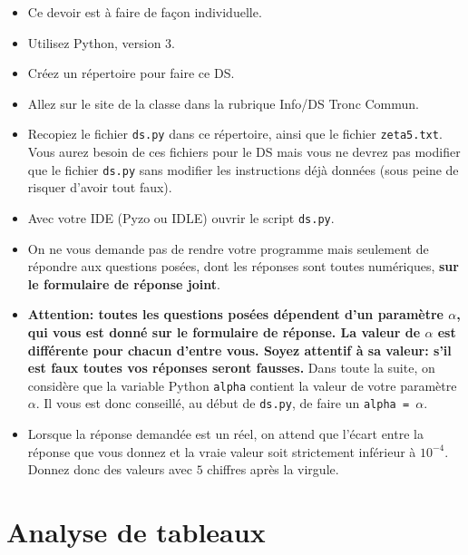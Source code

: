 \exer{}
\setcounter{numques}{0}

\begin{itemize}
\item Ce devoir est à faire de façon individuelle.
\item Utilisez Python, version 3.
\item Créez un répertoire pour faire ce DS.
\item Allez sur le site de la classe dans la rubrique Info/DS Tronc Commun.
\item Recopiez le fichier
  \texttt{ds.py} dans ce répertoire, ainsi
  que le fichier \texttt{zeta5.txt}.
  Vous aurez besoin de ces fichiers pour le DS mais vous ne devrez pas
 modifier que le fichier \texttt{ds.py} sans modifier les instructions déjà données (sous peine de risquer d'avoir tout faux).
\item Avec votre IDE (Pyzo ou IDLE) ouvrir le script \texttt{ds.py}. 
\item On ne vous demande pas de rendre votre programme mais seulement
  de répondre aux questions posées, dont les réponses sont toutes
  numériques, \textbf{sur le formulaire de réponse joint}.
\item \textbf{Attention: toutes les questions posées dépendent d'un
  paramètre $\alpha$, qui vous est donné sur le formulaire de réponse. La valeur de
  $\alpha$ est différente pour chacun d'entre vous. Soyez attentif à
  sa valeur: s'il est faux toutes vos réponses seront fausses.}
  Dans toute la suite, on considère que la variable Python \texttt{alpha}
  contient la valeur de votre paramètre $\alpha$. Il vous est donc
  conseillé, au début de \texttt{ds.py}, de faire un \texttt{alpha =
    $\alpha$}.
\item Lorsque la réponse demandée est un réel, on attend que l'écart
  entre la réponse que vous donnez et la vraie valeur soit strictement
  inférieur à $10^{-4}$. Donnez donc des valeurs avec $5$ chiffres après la
  virgule.
\end{itemize}


\section*{Analyse de tableaux}

